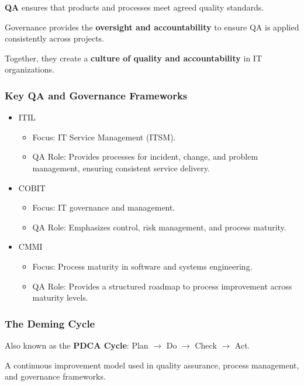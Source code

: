 \bigskip

\textbf{QA} ensures that products and processes meet agreed quality standards.

Governance provides the \textbf{oversight and accountability} to ensure QA is applied consistently across projects.

Together, they create a \textbf{culture of quality and accountability} in IT organizations.

\subsubsection{Key QA and Governance Frameworks}

\indent 

\begin{itemize}
    \item ITIL
    \begin{itemize}
        \item Focus: IT Service Management (ITSM).
        \item QA Role: Provides processes for incident, change, and problem management, ensuring consistent service delivery.
    \end{itemize}
    \item COBIT
    \begin{itemize}
        \item Focus: IT governance and management.
        \item QA Role: Emphasizes control, risk management, and process maturity.
    \end{itemize}
    \item CMMI
    \begin{itemize}
        \item Focus: Process maturity in software and systems engineering.
        \item QA Role: Provides a structured roadmap to process improvement across maturity levels.
    \end{itemize}
\end{itemize}

\subsubsection{The Deming Cycle}

\indent 

Also known as the \textbf{PDCA Cycle}: Plan $\xrightarrow{}$ Do $\xrightarrow{}$ Check $\xrightarrow{}$ Act.

A continuous improvement model used in quality assurance, process management, and governance frameworks.

